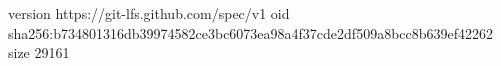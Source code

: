version https://git-lfs.github.com/spec/v1
oid sha256:b734801316db39974582ce3bc6073ea98a4f37cde2df509a8bcc8b639ef42262
size 29161
